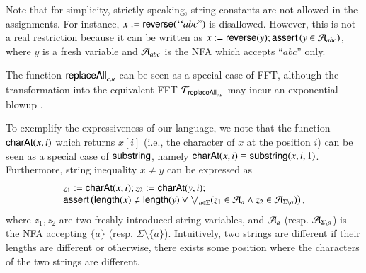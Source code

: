 \begin{remark}
Note that %
for simplicity, strictly speaking, string constants are not allowed in the assignments. %
For instance, %
$x:=\mathsf{reverse}({\mbox``}abc\mbox{''})$ is disallowed. However, this is not a real restriction because it can be written as $x:=\mathsf{reverse}(y); \textsf{assert}\left(y \in \mathcal{A}_{abc}\right)$, where $y$ is a fresh variable and $\mathcal{A}_{abc}$ is the NFA which accepts ``$abc$''  only.
\end{remark}


\begin{remark}
The function $\mathsf{replaceAll}_{e,u}$ can be seen as a special case of FFT, although the transformation into the equivalent FFT $\mathcal{T}_{\mathsf{replaceAll}_{e,u}}$ may incur an exponential blowup \cite{CCH+18}.
\end{remark}

To exemplify the expressiveness of our language, we note that the function $\mathsf{charAt}(x, i)$ which returns $x[i]$ (i.e., the character of $x$ at the position $i$) can be seen as a special case of $\mathsf{substring}$, namely $\mathsf{charAt}(x, i) \equiv \mathsf{substring}(x, i, 1)$. Furthermore, string inequality $x \neq y$ can be expressed as 
\[
\begin{array}{l}
z_1:=\mathsf{charAt}(x,i); z_2 := \mathsf{charAt}(y,i); \\
\textsf{assert}\left(\mathsf{length}(x) \neq \mathsf{length}(y) \vee \bigvee_{a \in \Sigma} (z_1 \in \mathcal{A}_a \wedge z_2 \in \mathcal{A}_{\Sigma \setminus a})\right),
\end{array}
\] 
where $z_1,z_2$ are two freshly introduced string variables, and $\mathcal{A}_a$ (resp. $\mathcal{A}_{\Sigma \setminus a}$) is the NFA accepting $\{a\}$ (resp. $\Sigma \setminus \{a\}$). Intuitively, two strings are different if their lengths are different or otherwise, there exists some position where the characters of the two strings are different.
 




